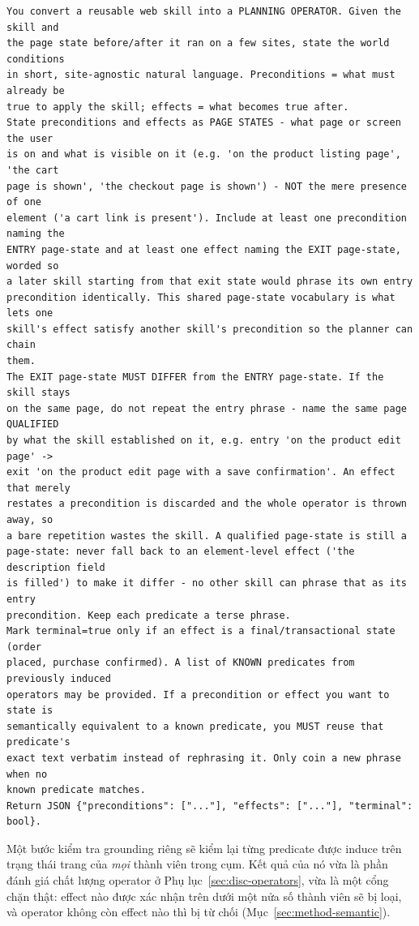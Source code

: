\begin{lstlisting}[style=mystyle,numbers=none,basicstyle=\scriptsize\ttfamily]
You convert a reusable web skill into a PLANNING OPERATOR. Given the skill and
the page state before/after it ran on a few sites, state the world conditions
in short, site-agnostic natural language. Preconditions = what must already be
true to apply the skill; effects = what becomes true after.
State preconditions and effects as PAGE STATES - what page or screen the user
is on and what is visible on it (e.g. 'on the product listing page', 'the cart
page is shown', 'the checkout page is shown') - NOT the mere presence of one
element ('a cart link is present'). Include at least one precondition naming the
ENTRY page-state and at least one effect naming the EXIT page-state, worded so
a later skill starting from that exit state would phrase its own entry
precondition identically. This shared page-state vocabulary is what lets one
skill's effect satisfy another skill's precondition so the planner can chain
them.
The EXIT page-state MUST DIFFER from the ENTRY page-state. If the skill stays
on the same page, do not repeat the entry phrase - name the same page QUALIFIED
by what the skill established on it, e.g. entry 'on the product edit page' ->
exit 'on the product edit page with a save confirmation'. An effect that merely
restates a precondition is discarded and the whole operator is thrown away, so
a bare repetition wastes the skill. A qualified page-state is still a
page-state: never fall back to an element-level effect ('the description field
is filled') to make it differ - no other skill can phrase that as its entry
precondition. Keep each predicate a terse phrase.
Mark terminal=true only if an effect is a final/transactional state (order
placed, purchase confirmed). A list of KNOWN predicates from previously induced
operators may be provided. If a precondition or effect you want to state is
semantically equivalent to a known predicate, you MUST reuse that predicate's
exact text verbatim instead of rephrasing it. Only coin a new phrase when no
known predicate matches.
Return JSON {"preconditions": ["..."], "effects": ["..."], "terminal": bool}.
\end{lstlisting}

\noindent
Một bước kiểm tra grounding riêng sẽ kiểm lại từng predicate được induce trên
trạng thái trang của \emph{mọi} thành viên trong cụm. Kết quả của nó vừa là
phần đánh giá chất lượng operator ở Phụ lục~\ref{sec:disc-operators}, vừa là một
cổng chặn thật: effect nào được xác nhận trên dưới một nửa số thành viên sẽ bị
loại, và operator không còn effect nào thì bị từ chối
(Mục~\ref{sec:method-semantic}).

